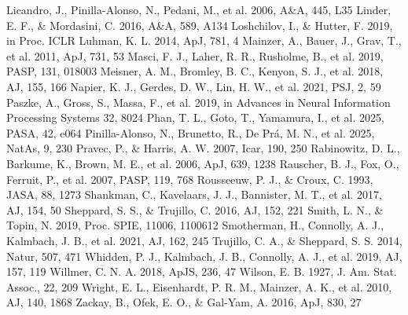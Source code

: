 \documentclass[twocolumn,linenumbers]{aastex702}
\begin{document}
\begin{thebibliography}{}
 Licandro, J., Pinilla-Alonso, N., Pedani, M., et al. 2006, A\&A, 445, L35
 Linder, E. F., \& Mordasini, C. 2016, A\&A, 589, A134
 Loshchilov, I., \& Hutter, F. 2019, in Proc. ICLR
 Luhman, K. L. 2014, ApJ, 781, 4
 Mainzer, A., Bauer, J., Grav, T., et al. 2011, ApJ, 731, 53
 Masci, F. J., Laher, R. R., Rusholme, B., et al. 2019, PASP, 131, 018003
 Meisner, A. M., Bromley, B. C., Kenyon, S. J., et al. 2018, AJ, 155, 166
 Napier, K. J., Gerdes, D. W., Lin, H. W., et al. 2021, PSJ, 2, 59
 Paszke, A., Gross, S., Massa, F., et al. 2019, in Advances in Neural Information Processing Systems 32, 8024
 Phan, T. L., Goto, T., Yamamura, I., et al. 2025, PASA, 42, e064
 Pinilla-Alonso, N., Brunetto, R., De Pr{\'a}, M. N., et al. 2025, NatAs, 9, 230
 Pravec, P., \& Harris, A. W. 2007, Icar, 190, 250
 Rabinowitz, D. L., Barkume, K., Brown, M. E., et al. 2006, ApJ, 639, 1238
 Rauscher, B. J., Fox, O., Ferruit, P., et al. 2007, PASP, 119, 768
 Rousseeuw, P. J., \& Croux, C. 1993, JASA, 88, 1273
 Shankman, C., Kavelaars, J. J., Bannister, M. T., et al. 2017, AJ, 154, 50
 Sheppard, S. S., \& Trujillo, C. 2016, AJ, 152, 221
 Smith, L. N., \& Topin, N. 2019, Proc. SPIE, 11006, 1100612
 Smotherman, H., Connolly, A. J., Kalmbach, J. B., et al. 2021, AJ, 162, 245
 Trujillo, C. A., \& Sheppard, S. S. 2014, Natur, 507, 471
 Whidden, P. J., Kalmbach, J. B., Connolly, A. J., et al. 2019, AJ, 157, 119
 Willmer, C. N. A. 2018, ApJS, 236, 47
 Wilson, E. B. 1927, J. Am. Stat. Assoc., 22, 209
 Wright, E. L., Eisenhardt, P. R. M., Mainzer, A. K., et al. 2010, AJ, 140, 1868
 Zackay, B., Ofek, E. O., \& Gal-Yam, A. 2016, ApJ, 830, 27
\end{thebibliography}
\end{document}
